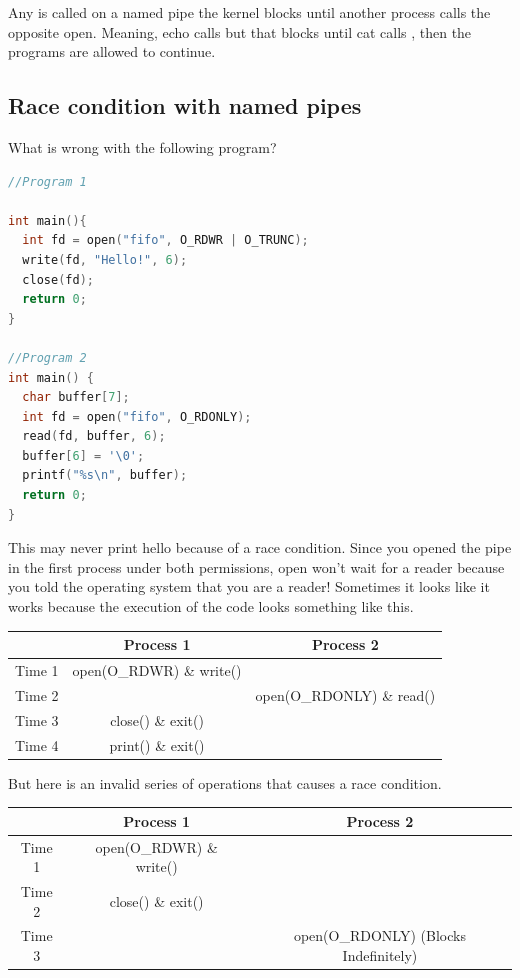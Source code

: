 Any  is called on a named pipe the kernel blocks until another process calls the opposite open. Meaning, echo calls  but that blocks until cat calls , then the programs are allowed to continue.

\subsection{Race condition with named pipes}

What is wrong with the following program?

\begin{lstlisting}[language=C]
//Program 1

int main(){
  int fd = open("fifo", O_RDWR | O_TRUNC);
  write(fd, "Hello!", 6);
  close(fd);
  return 0;
}

//Program 2
int main() {
  char buffer[7];
  int fd = open("fifo", O_RDONLY);
  read(fd, buffer, 6);
  buffer[6] = '\0';
  printf("%s\n", buffer);
  return 0;
}
\end{lstlisting}

This may never print hello because of a race condition.
Since you opened the pipe in the first process under both permissions, open won't wait for a reader because you told the operating system that you are a reader!
Sometimes it looks like it works because the execution of the code looks something like this.

\begin{tabular}{|c|c|c|}
  & Process 1 & Process 2 \\ \hline
  Time 1 & open(O\_RDWR) \& write() & \\
  Time 2 & & open(O\_RDONLY) \& read() \\
  Time 3 & close() \& exit() & \\
  Time 4 & print() \& exit() & \\
\end{tabular}

But here is an invalid series of operations that causes a race condition.

\begin{tabular}{|c|c|c|}
  & Process 1 & Process 2 \\ \hline
  Time 1 & open(O\_RDWR) \& write() & \\
  Time 2 & close() \& exit() & \\
  Time 3 & & open(O\_RDONLY) (Blocks Indefinitely) \\
\end{tabular}

